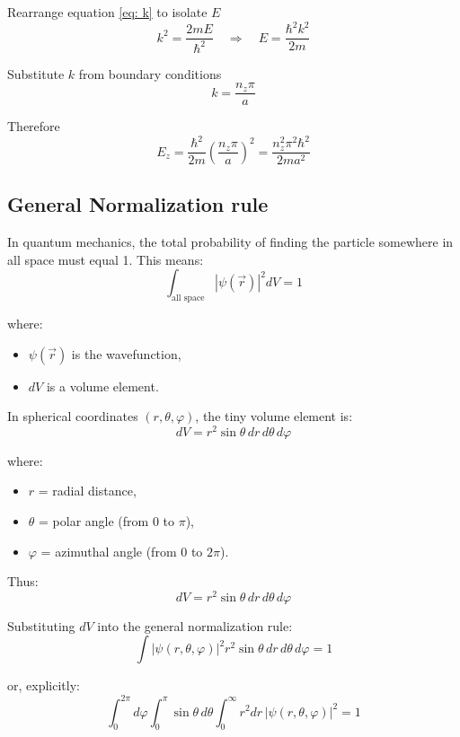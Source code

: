 \documentclass[12pt]{article}
\begin{document}
        Rearrange equation \ref{eq: k} to isolate $E$
        \[
            k^2 = \frac{2mE}{\hbar^2}
            \quad \Rightarrow \quad
            E = \frac{\hbar^2 k^2}{2m}
        \]

        Substitute $k$ from boundary conditions
        \[
            k = \frac{n_z \pi}{a}
        \]

        Therefore
        \[
            E_z = \frac{\hbar^2}{2m} \left( \frac{n_z \pi}{a} \right)^2 = \frac{n_z^2 \pi^2 \hbar^2}{2m a^2}
        \]

    \subsection{General Normalization rule} \label{sec: norm}
        In quantum mechanics, the total probability of finding the particle somewhere in all space must equal 1. This means:
        \[
            \int_{\text{all space}} |\psi(\vec{r})|^2 dV = 1
        \]

        where:
        \begin{itemize}
            \item \( \psi(\vec{r}) \) is the wavefunction,
            \item \( dV \) is a volume element.
        \end{itemize}

        In spherical coordinates \((r, \theta, \varphi)\), the tiny volume element is:
        \[
            dV = r^2 \sin\theta \, dr \, d\theta \, d\varphi
        \]

        where:
        \begin{itemize}
            \item \( r \) = radial distance,
            \item \( \theta \) = polar angle (from \( 0 \) to \( \pi \)),
            \item \( \varphi \) = azimuthal angle (from \( 0 \) to \( 2\pi \)).
        \end{itemize}

        Thus:
        \[
            dV = r^2 \sin\theta \, dr \, d\theta \, d\varphi
        \]

        Substituting \( dV \) into the general normalization rule:
        \[
            \int |\psi(r,\theta,\varphi)|^2 r^2 \sin\theta \, dr \, d\theta \, d\varphi = 1
        \]

        or, explicitly:
        \[
            \int_0^{2\pi} d\varphi \int_0^{\pi} \sin\theta \, d\theta \int_0^\infty r^2 dr \, |\psi(r,\theta,\varphi)|^2 = 1
        \]



    
\end{document}

